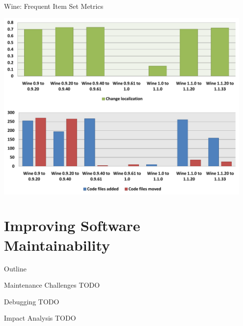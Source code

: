 
\begin{frame}{Wine: Frequent Item Set Metrics}

  \begin{center}
    \includegraphics[width=0.95\textwidth]{minings/wine-fis-metrics}
  \end{center}

\end{frame}



\section{Improving Software Maintainability}

\begin{frame}{Outline}
  \tableofcontents[current]
\end{frame}


\begin{frame}{Maintenance Challenges}
  TODO
\end{frame}


\begin{frame}{Debugging}
  TODO
\end{frame}


\begin{frame}{Impact Analysis}
  TODO
\end{frame}

